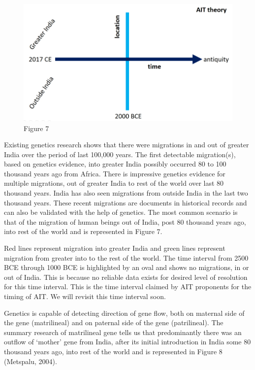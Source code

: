 \begin{figure}
\includegraphics{"images/8-07.jpg"}
\caption{Figure 7}
\end{figure}

Existing genetics research shows that there were migrations in and out of greater India over the period of last 100,000 years. The first detectable migration(s), based on genetics evidence, into greater India possibly occurred 80 to 100 thousand years ago from Africa. There is impressive genetics evidence for multiple migrations, out of greater India to rest of the world over last 80 thousand years. India has also seen migrations from outside India in the last two thousand years. These recent migrations are documents in historical records and can also be validated with the help of genetics. The most common scenario is that of the migration of human beings out of India, post 80 thousand years ago, into rest of the world and is represented in Figure 7.

Red lines represent migration into greater India and green lines represent migration from greater into to the rest of the world. The time interval from 2500 BCE through 1000 BCE is highlighted by an oval and shows no migrations, in or out of India. This is because no reliable data exists for desired level of resolution for this time interval. This is the time interval claimed by AIT proponents for the timing of AIT. We will revisit this time interval soon.

Genetics is capable of detecting direction of gene flow, both on maternal side of the gene (matrilineal) and on paternal side of the gene (patrilineal). The summary research of matrilineal gene tells us that predominantly there was an outflow of ‘mother’ gene from India, after its initial introduction in India some 80 thousand years ago, into rest of the world and is represented in Figure 8 (Metspalu, 2004).

